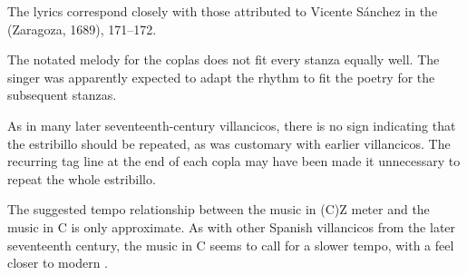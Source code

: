 

The lyrics correspond closely with those attributed to Vicente Sánchez in the  (Zaragoza, 1689), 171--172.

The notated melody for the coplas does not fit every stanza equally well.
The singer was apparently expected to adapt the rhythm to fit the poetry for the subsequent stanzas.

As in many later seventeenth-century villancicos, there is no sign indicating that the estribillo should be repeated, as was customary with earlier villancicos.
The recurring tag line at the end of each copla may have been made it unnecessary to repeat the whole estribillo.

The suggested tempo relationship between the music in (C)Z meter and the music in C is only approximate. 
As with other Spanish villancicos from the later seventeenth century, the music in C seems to call for a slower tempo, with a feel closer to modern .